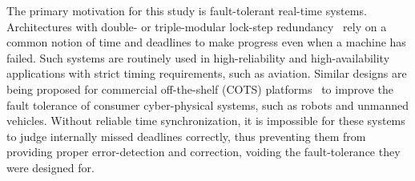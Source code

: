 The primary motivation for this study is fault-tolerant real-time systems.
Architectures with double- or triple-modular lock-step redundancy~\cite{triple-modular-redundancy,triple-modular-redundancy-evaluation,triple-modular-lock-step-arm}
rely on a common notion of time and deadlines to make progress even when a machine has failed.
Such systems are routinely used in high-reliability and high-availability applications with strict timing requirements, such as aviation.
Similar designs are being proposed for commercial off-the-shelf (COTS) platforms~\cite{gujarati2022concretes,gandhi2021rebound,loveless2021igor} to improve the fault tolerance of consumer cyber-physical systems, such as robots and unmanned vehicles.
Without reliable time synchronization, it is impossible for these systems to judge internally missed deadlines correctly, thus preventing them from providing proper error-detection and correction, voiding the fault-tolerance they were designed for.


